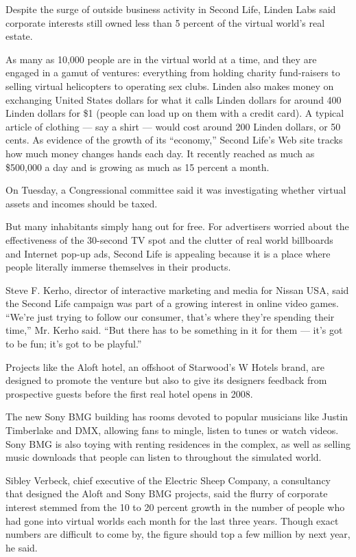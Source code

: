 Despite the surge of outside business activity in Second Life, Linden
Labs said corporate interests still owned less than 5 percent of the
virtual world's real estate.

As many as 10,000 people are in the virtual world at a time, and they
are engaged in a gamut of ventures: everything from holding charity
fund-raisers to selling virtual helicopters to operating sex clubs.
Linden also makes money on exchanging United States dollars for what it
calls Linden dollars for around 400 Linden dollars for \$1 (people can
load up on them with a credit card). A typical article of clothing ---
say a shirt --- would cost around 200 Linden dollars, or 50 cents. As
evidence of the growth of its ``economy,'' Second Life's Web site tracks
how much money changes hands each day. It recently reached as much as
\$500,000 a day and is growing as much as 15 percent a month.

On Tuesday, a Congressional committee said it was investigating whether
virtual assets and incomes should be taxed.

But many inhabitants simply hang out for free. For advertisers worried
about the effectiveness of the 30-second TV spot and the clutter of real
world billboards and Internet pop-up ads, Second Life is appealing
because it is a place where people literally immerse themselves in their
products.

Steve F. Kerho, director of interactive marketing and media for Nissan
USA, said the Second Life campaign was part of a growing interest in
online video games. ``We're just trying to follow our consumer, that's
where they're spending their time,'' Mr. Kerho said. ``But there has to
be something in it for them --- it's got to be fun; it's got to be
playful.''

Projects like the Aloft hotel, an offshoot of Starwood's W Hotels brand,
are designed to promote the venture but also to give its designers
feedback from prospective guests before the first real hotel opens in
2008.

The new Sony BMG building has rooms devoted to popular musicians like
Justin Timberlake and DMX, allowing fans to mingle, listen to tunes or
watch videos. Sony BMG is also toying with renting residences in the
complex, as well as selling music downloads that people can listen to
throughout the simulated world.

Sibley Verbeck, chief executive of the Electric Sheep Company, a
consultancy that designed the Aloft and Sony BMG projects, said the
flurry of corporate interest stemmed from the 10 to 20 percent growth in
the number of people who had gone into virtual worlds each month for the
last three years. Though exact numbers are difficult to come by, the
figure should top a few million by next year, he said.

